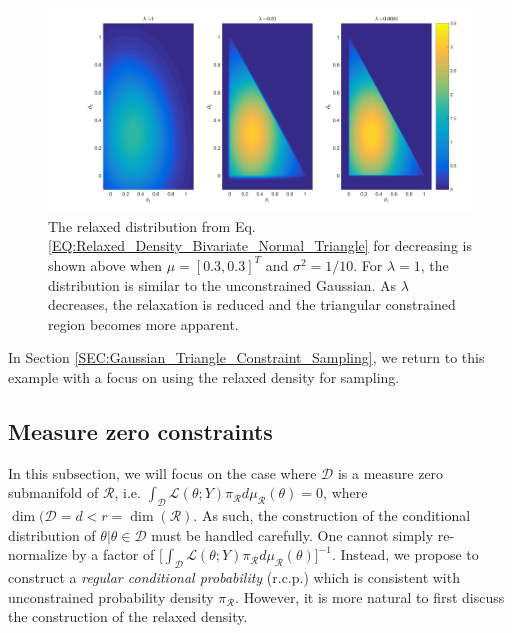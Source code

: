 \documentclass[10pt,fleqn]{article}
\DeclareMathOperator{\1}{\mathbbm{1}}
\begin{document}
{\begin{figure}[h!]
\begin{center}
\includegraphics[width=1\textwidth,natwidth=610,natheight=642]{Bivariate_Normal_Triangle_Constraint.jpg}
\end{center}
\caption{The relaxed distribution from Eq. \eqref{EQ:Relaxed_Density_Bivariate_Normal_Triangle} for decreasing is shown above when $\mu = [0.3, 0.3]^T$ and $\sigma^2 = 1/10.$  For $\lambda=1$, the distribution is similar to the unconstrained Gaussian.  As $\lambda$ decreases, the relaxation is reduced and the triangular constrained region becomes more apparent.}
\label{FIG:Bivariate_Normal_Triangle_Constraint_Relaxation}
\end{figure}
In Section \ref{SEC:Gaussian_Triangle_Constraint_Sampling}, we return to this example with a focus on using the relaxed density for sampling.


\subsection{Measure zero constraints}
\label{SEC:Zero_Measure_Methods}

In this subsection, we will focus on the case where $\mathcal{D}$ is a measure zero submanifold of $\mathcal{R}$, i.e. $\int_\mathcal{D}\mathcal{L}(\theta;Y)\pi_\mathcal{R}d\mu_\mathcal{R}(\theta)=0$, where $\dim(\mathcal{D} = d < r =\dim(\mathcal{R})$. As such, the construction of the conditional distribution of $\theta|\theta \in \mathcal{D}$ must be handled carefully. One cannot simply re-normalize by a factor of $\big[\int_\mathcal{D}\mathcal{L}(\theta;Y)\pi_\mathcal{R}d\mu_\mathcal{R}(\theta)\big]^{-1}.$  Instead, we propose to construct a \emph{regular conditional probability} (r.c.p.) which is consistent with unconstrained probability density $\pi_\mathcal{R}.$  However, it is more natural to first discuss the construction of the relaxed density.

}
\end{document}
